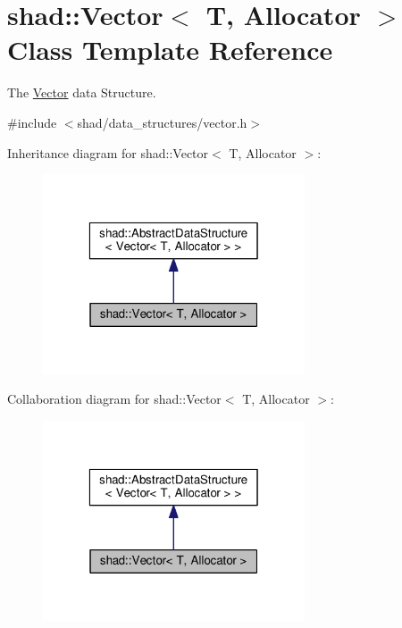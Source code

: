 \hypertarget{classshad_1_1Vector}{\section{shad\-:\-:Vector$<$ T, Allocator $>$ Class Template Reference}
\label{classshad_1_1Vector}
}


The \hyperlink{classshad_1_1Vector}{Vector} data Structure.  




{\ttfamily \#include $<$shad/data\-\_\-structures/vector.\-h$>$}



Inheritance diagram for shad\-:\-:Vector$<$ T, Allocator $>$\-:
\nopagebreak
\begin{figure}[H]
\begin{center}
\leavevmode
\includegraphics[width=220pt]{classshad_1_1Vector__inherit__graph}
\end{center}
\end{figure}


Collaboration diagram for shad\-:\-:Vector$<$ T, Allocator $>$\-:
\nopagebreak
\begin{figure}[H]
\begin{center}
\leavevmode
\includegraphics[width=220pt]{classshad_1_1Vector__coll__graph}
\end{center}
\end{figure}
